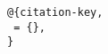 \documentclass{article}
\begin{document}
\begin{multicols}{2}
\vspace{0.5cm}
\noindent \textbf{}
\begin{verbatim}
@{citation-key,
 = {},
}
\end{verbatim}

\end{multicols}
%
%
\end{document}
